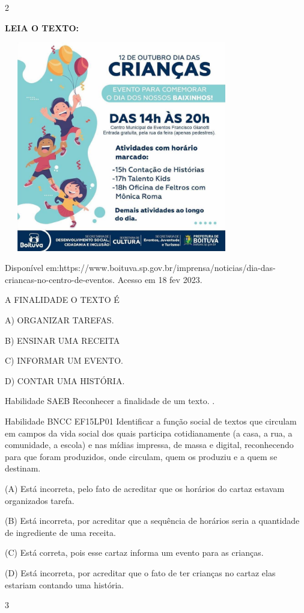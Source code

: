 \begin{escola}
\num{2}

\textbf{LEIA O TEXTO:}

\includegraphics[width=4.03663in,height=3.60910in]{media/image158.jpg}

Disponível
em:https://www.boituva.sp.gov.br/imprensa/noticias/dia-das-criancas-no-centro-de-eventos.
Acesso em 18 fev 2023.

A FINALIDADE O TEXTO É

A) ORGANIZAR TAREFAS.

B) ENSINAR UMA RECEITA

C) INFORMAR UM EVENTO.

D) CONTAR UMA HISTÓRIA.

Habilidade SAEB Reconhecer a finalidade de um texto. .

Habilidade BNCC EF15LP01 Identificar a função social de textos que
circulam em campos da vida social dos quais participa cotidianamente (a
casa, a rua, a comunidade, a escola) e nas mídias impressa, de massa e
digital, reconhecendo para que foram produzidos, onde circulam, quem os
produziu e a quem se destinam.

(A) Está incorreta, pelo fato de acreditar que os horários do cartaz
estavam organizados tarefa.

(B) Está incorreta, por acreditar que a sequência de horários seria a
quantidade de ingrediente de uma receita.

(C) Está correta, pois esse cartaz informa um evento para as crianças.

(D) Está incorreta, por acreditar que o fato de ter crianças no cartaz
elas estariam contando uma história.

\num{3}


\end{escola}
